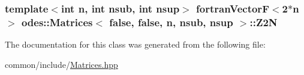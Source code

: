 \subsubsection[{Z2\+N}]{\setlength{\rightskip}{0pt plus 5cm}template$<$int n, int nsub, int nsup$>$ {\bf fortran\+Vector\+F}$<$2$\ast$n$>$ {\bf odes\+::\+Matrices}$<$ false, false, n, nsub, nsup $>$\+::Z2\+N\hspace{0.3cm}{\ttfamily [private]}}\label{classodes_1_1Matrices_3_01false_00_01false_00_01n_00_01nsub_00_01nsup_01_4_a1e70bb1cfd110fc9ae14f8ecd66cbc85}


The documentation for this class was generated from the following file\+:\begin{DoxyCompactItemize}
\item 
common/include/\hyperlink{Matrices_8hpp}{Matrices.\+hpp}\end{DoxyCompactItemize}
